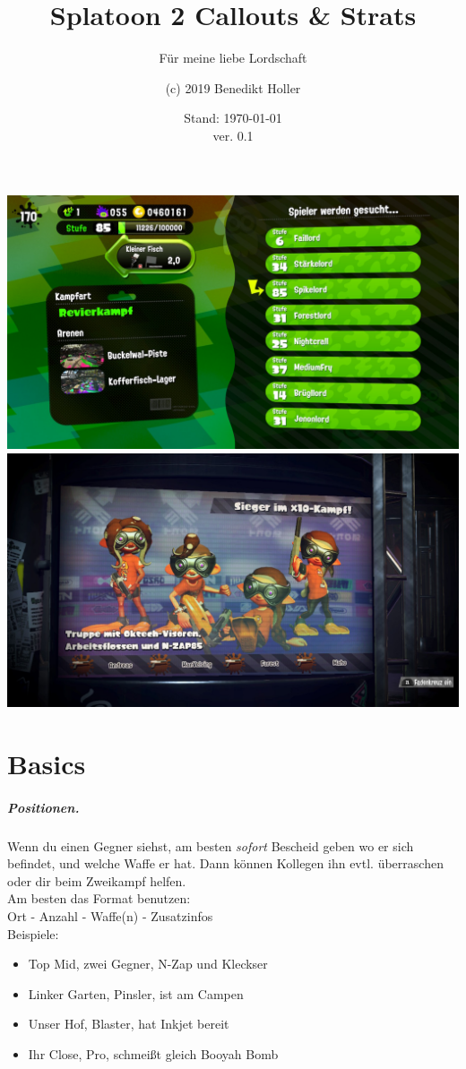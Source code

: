 \documentclass{scrreprt}
\title{Splatoon 2 Callouts \&  Strats}
\subtitle{Für meine liebe Lordschaft}
\author{(c) 2019 Benedikt Holler}
\date{Stand: \today \\ ver. 0.1}
\begin{document}
\maketitle
\begin{center}
\includegraphics[width=\linewidth]{img/lerds.jpg}
\includegraphics[width=\linewidth]{img/splatfest.jpg}
\end{center}
\tableofcontents

\chapter{Basics}
\paragraph{Positionen.} Wenn du einen Gegner siehst, am besten \emph{sofort} Bescheid geben wo er sich befindet, und welche Waffe er hat. Dann können Kollegen ihn evtl. überraschen oder dir beim Zweikampf helfen. \\
Am besten das Format benutzen: \\
Ort - Anzahl - Waffe(n) - Zusatzinfos\\
Beispiele: 
\begin{itemize}
	\item Top Mid, zwei Gegner, N-Zap und Kleckser
	\item Linker Garten, Pinsler, ist am Campen
	\item Unser Hof, Blaster, hat Inkjet bereit
	\item Ihr Close, Pro, schmeißt gleich Booyah Bomb
\end{itemize}
\end{document}
